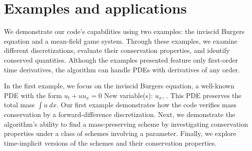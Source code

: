 \documentclass[runningheads]{llncs}
\newcommand{\1}{\chi}
\begin{document}
\section{Examples and applications}
\label{eaa}
We demonstrate our code's capabilities using two examples: the inviscid Burgers equation and a mean-field game system. 
Through these examples, we examine different discretizations, evaluate their conservation properties, and identify conserved quantities.
Although the examples presented feature only first-order time derivatives, the algorithm can handle PDEs with derivatives of any order.

In the first example, we focus on the inviscid Burgers equation, a well-known PDE with the form \(u_t + uu_x = 0\)
{\color{blue} New variable(s): \(u_x\),  }
 \cite{smoller94}. 
This PDE preserves the total mass \(\int u\ dx\).
Our first example demonstrates how the code verifies mass conservation by a forward-difference discretization.
Next, we demonstrate the algorithm's ability to find a mass-preserving scheme by investigating conservation properties under a class of schemes involving a parameter.
Finally, we explore time-implicit versions of the schemes and their conservation properties.
\end{document}
